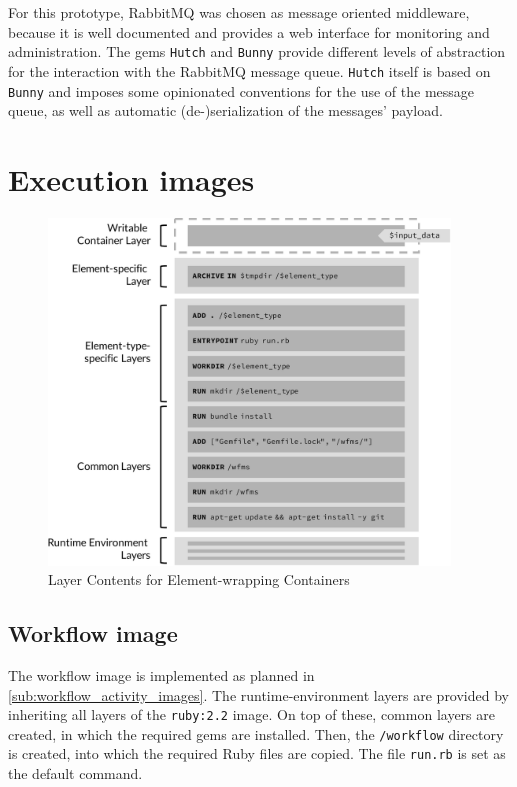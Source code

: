   For this prototype, RabbitMQ was chosen as message oriented middleware, because it is well documented and provides a web interface for monitoring and administration.
  The gems \texttt{Hutch} and \texttt{Bunny} provide different levels of abstraction for the interaction with the RabbitMQ message queue. \texttt{Hutch} itself is based on \texttt{Bunny} and imposes some opinionated conventions for the use of the message queue, as well as automatic (de-)serialization of the messages' payload.

\section{Execution images} %
\label{sec:execution_images}
  \begin{figure}[htbp]
    \centering
    \includegraphics[width=0.95\textwidth]{content/images/execution_container-crop.pdf}
    \caption{Layer Contents for Element-wrapping Containers}
    \label{fig:detailed_layers_for_element_wrapping_containers}
  \end{figure}

  \subsection{Workflow image} %
  \label{sub:workflow_container}
    The workflow image is implemented as planned in \ref{sub:workflow_activity_images}. The runtime-environment layers are provided by inheriting all layers of the \texttt{ruby:2.2} image. On top of these, common layers are created, in which the required gems are installed. Then, the \texttt{/workflow} directory is created, into which the required Ruby files are copied. The file \texttt{run.rb} is set as the default command.

